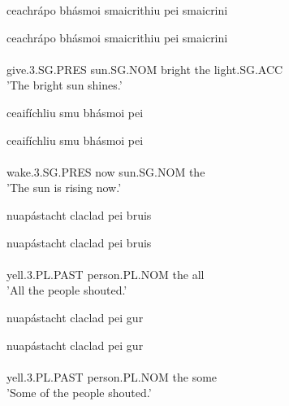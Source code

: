 \documentclass{article}
\begin{document}
\begin{exe}
\ex \begin{ogham} ceachrápo bhásmoi smaicrithiu pei smaicrini \end{ogham}
\glll ceachrápo bhásmoi smaicrithiu pei smaicrini\\
    \\
give.3.SG.PRES sun.SG.NOM bright the light.SG.ACC\\
\trans 'The bright sun shines.'
\end{exe}
\begin{exe}
\ex \begin{ogham} ceaifíchliu smu bhásmoi pei \end{ogham}
\glll ceaifíchliu smu bhásmoi pei\\
   \\
wake.3.SG.PRES now sun.SG.NOM the\\
\trans 'The sun is rising now.'
\end{exe}
\begin{exe}
\ex \begin{ogham} nuapástacht claclad pei bruis \end{ogham}
\glll nuapástacht claclad pei bruis\\
   \\
yell.3.PL.PAST person.PL.NOM the all\\
\trans 'All the people shouted.'
\end{exe}
\begin{exe}
\ex \begin{ogham} nuapástacht claclad pei gur \end{ogham}
\glll nuapástacht claclad pei gur\\
   \\
yell.3.PL.PAST person.PL.NOM the some\\
\trans 'Some of the people shouted.'
\end{exe}
\newpage
\end{document}
